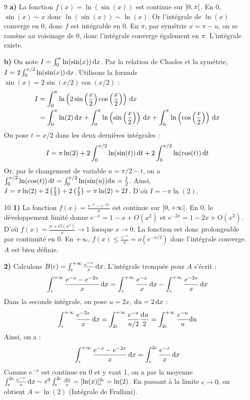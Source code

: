 \begin{correction}{9}
\textbf{a)} La fonction $f(x) = \ln(\sin(x))$ est continue sur $\left]0, \pi\right[$.
En $0$, $\sin(x) \sim x$ donc $\ln(\sin(x)) \sim \ln(x)$. Or l'intégrale de $\ln(x)$ converge en 0, donc $f$ est intégrable en 0.
En $\pi$, par symétrie $x = \pi - u$, on se ramène au voisinage de 0, donc l'intégrale converge également en $\pi$. L'intégrale existe.

\textbf{b)} On note $I = \int_{0}^{\pi} \ln(\sin(x)) \,\mathrm{d}x$. Par la relation de Chasles et la symétrie, $I = 2 \int_{0}^{\pi/2} \ln(\sin(x)) \,\mathrm{d}x$.
Utilisons la formule $\sin(x) = 2\sin(x/2)\cos(x/2)$ :
\begin{align*}
I &= \int_{0}^{\pi} \ln\left(2\sin\left(\frac{x}{2}\right)\cos\left(\frac{x}{2}\right)\right) \,\mathrm{d}x \\
  &= \int_{0}^{\pi} \ln(2) \,\mathrm{d}x + \int_{0}^{\pi} \ln\left(\sin\left(\frac{x}{2}\right)\right) \,\mathrm{d}x + \int_{0}^{\pi} \ln\left(\cos\left(\frac{x}{2}\right)\right) \,\mathrm{d}x
\end{align*}
On pose $t=x/2$ dans les deux dernières intégrales :
$$ I = \pi\ln(2) + 2\int_{0}^{\pi/2} \ln(\sin(t)) \,\mathrm{d}t + 2\int_{0}^{\pi/2} \ln(\cos(t)) \,\mathrm{d}t $$
Or, par le changement de variable $u = \pi/2 - t$, on a $\int_{0}^{\pi/2} \ln(\cos(t)) \,\mathrm{d}t = \int_{0}^{\pi/2} \ln(\sin(u)) \mathrm{d}u = \frac{I}{2}$.
Ainsi, $I = \pi\ln(2) + 2\left(\frac{I}{2}\right) + 2\left(\frac{I}{2}\right) = \pi\ln(2) + 2I$.
D'où $I = -\pi\ln(2)$.
\end{correction}

\begin{correction}{10}
\textbf{1)} La fonction $f(x) = \frac{e^{-x}-e^{-2x}}{x}$ est continue sur $\left]0, +\infty\right[$.
En $0$, le développement limité donne $e^{-x} = 1 - x + O(x^2)$ et $e^{-2x} = 1 - 2x + O(x^2)$.
D'où $f(x) = \frac{x + O(x^2)}{x} \to 1$ lorsque $x \to 0$. La fonction est donc prolongeable par continuité en 0.
En $+\infty$, $f(x) \le \frac{e^{-x}}{x} = o(e^{-x/2})$ donc l'intégrale converge. $A$ est bien définie.

\textbf{2)} Calculons $B(\epsilon) = \int_{\epsilon}^{+\infty}\frac{e^{-x}}{x}\,\mathrm{d}x$. L'intégrale tronquée pour $A$ s'écrit :
$$ \int_{\epsilon}^{+\infty} \frac{e^{-x}-e^{-2x}}{x} \,\mathrm{d}x = \int_{\epsilon}^{+\infty} \frac{e^{-x}}{x} \,\mathrm{d}x - \int_{\epsilon}^{+\infty} \frac{e^{-2x}}{x} \,\mathrm{d}x $$
Dans la seconde intégrale, on pose $u = 2x$, $\mathrm{d}u = 2\,\mathrm{d}x$ :
$$ \int_{\epsilon}^{+\infty} \frac{e^{-2x}}{x} \,\mathrm{d}x = \int_{2\epsilon}^{+\infty} \frac{e^{-u}}{u/2} \frac{\mathrm{d}u}{2} = \int_{2\epsilon}^{+\infty} \frac{e^{-u}}{u} \mathrm{d}u $$
Ainsi, on a :
$$ \int_{\epsilon}^{+\infty} \frac{e^{-x}-e^{-2x}}{x} \,\mathrm{d}x = \int_{\epsilon}^{2\epsilon} \frac{e^{-x}}{x} \,\mathrm{d}x $$
Comme $e^{-x}$ est continue en 0 et y vaut 1, on a par la moyenne $\int_{\epsilon}^{2\epsilon} \frac{e^{-x}}{x} \,\mathrm{d}x \sim e^{0} \int_{\epsilon}^{2\epsilon} \frac{\,\mathrm{d}x}{x} = [\ln(x)]_{\epsilon}^{2\epsilon} = \ln(2)$.
En passant à la limite $\epsilon \to 0$, on obtient $A = \ln(2)$ (Intégrale de Frullani).
\end{correction}

